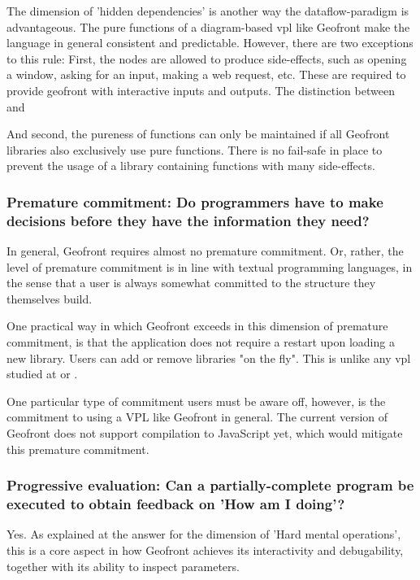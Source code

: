 The dimension of 'hidden dependencies' is another way the dataflow-paradigm is advantageous. 
The pure functions of a diagram-based vpl like Geofront make the language in general consistent and predictable.
However, there are two exceptions to this rule:
First, the  nodes are allowed to produce side-effects, such as opening a window, asking for an input, making a web request, etc. 
These are required to provide geofront with interactive inputs and outputs.
The distinction between  and \m{}

And second, the pureness of functions can only be maintained if all Geofront libraries also exclusively use pure functions. 
There is no fail-safe in place to prevent the usage of a library containing functions with many side-effects. 

\subsubsection*{Premature commitment: Do programmers have to make decisions before they have the information they need?}

In general, Geofront requires almost no premature commitment. 
Or, rather, the level of premature commitment is in line with textual programming languages, in the sense that a user is always somewhat committed to the structure they themselves build. 

One practical way in which Geofront exceeds in this dimension of premature commitment, is that the application does not require a restart upon loading a new library. 
Users can add or remove libraries "on the fly". 
This is unlike any vpl studied at  or .

One particular type of commitment users must be aware off, however, is the commitment to using a \ac{VPL} like Geofront in general.
The current version of Geofront does not support compilation to JavaScript yet, which would mitigate this premature commitment. 


\subsubsection*{Progressive evaluation: Can a partially-complete program be executed to obtain feedback on 'How am I doing'?}

Yes. 
As explained at the answer for the dimension of 'Hard mental operations', this is a core aspect in how Geofront achieves its interactivity and debugability, together with its ability to inspect parameters. 

